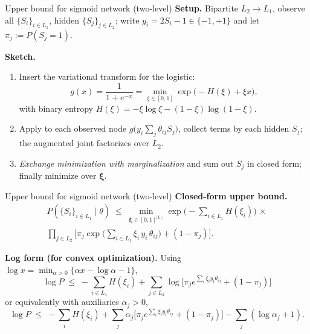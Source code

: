 \documentclass[10pt]{beamer}
\begin{document}
\begin{frame}{Upper bound for sigmoid network (two-level)}
\textbf{Setup.} Bipartite $L_2\!\to\!L_1$, observe all $\{S_i\}_{i\in L_1}$, hidden $\{S_j\}_{j\in L_2}$; write $y_i=2S_i-1\in\{-1,+1\}$ and let $\pi_j:=P(S_j=1)$.

\textbf{Sketch.}
\begin{enumerate}
  \item Insert the variational transform for the logistic:
  \[
  g(x)=\frac{1}{1+e^{-x}}=\min_{\xi\in[0,1]}\exp\!\big(-H(\xi)+\xi x\big),
  \]
  with binary entropy $H(\xi)=-\xi\log\xi-(1-\xi)\log(1-\xi)$.
  \item Apply to each observed node $g\big(y_i\sum_j \theta_{ij} S_j\big)$, collect terms by each hidden $S_j$; the augmented joint factorizes over $L_2$.
  \item \emph{Exchange minimization with marginalization} and sum out $S_j$ in closed form; finally minimize over $\boldsymbol{\xi}$.
\end{enumerate}
\end{frame}

\begin{frame}{Upper bound for sigmoid network (two-level)}
\textbf{Closed-form upper bound.}
\begin{multline*}
P(\{S_i\}_{i\in L_1}\mid \theta)
\;\le\; 
\min_{\boldsymbol{\xi}\in[0,1]^{|L_1|}}
\exp\!\Big(-\sum_{i\in L_1} H(\xi_i)\Big)\, \times \\
\prod_{j\in L_2}
\Big[
\pi_j \exp\!\Big(\sum_{i\in L_1} \xi_i\, y_i\, \theta_{ij}\Big)
+ (1-\pi_j)
\Big].
\end{multline*}

\textbf{Log form (for convex optimization).} Using $\log x=\min_{\alpha>0}\{\alpha x-\log\alpha-1\}$,
\[
\log P \;\le\;
-\sum_{i\in L_1} H(\xi_i)
+\sum_{j\in L_2}\log\!\Big[\pi_j e^{\sum_i \xi_i y_i \theta_{ij}}+(1-\pi_j)\Big]
\]
or equivalently with auxiliaries $\alpha_j>0$,
\[
\log P \;\le\;
-\sum_i H(\xi_i)
+\sum_j \alpha_j\!\Big[\pi_j e^{\sum_i \xi_i y_i \theta_{ij}}+(1-\pi_j)\Big]
-\sum_j(\log\alpha_j+1).
\]
\end{frame}
\end{document}
